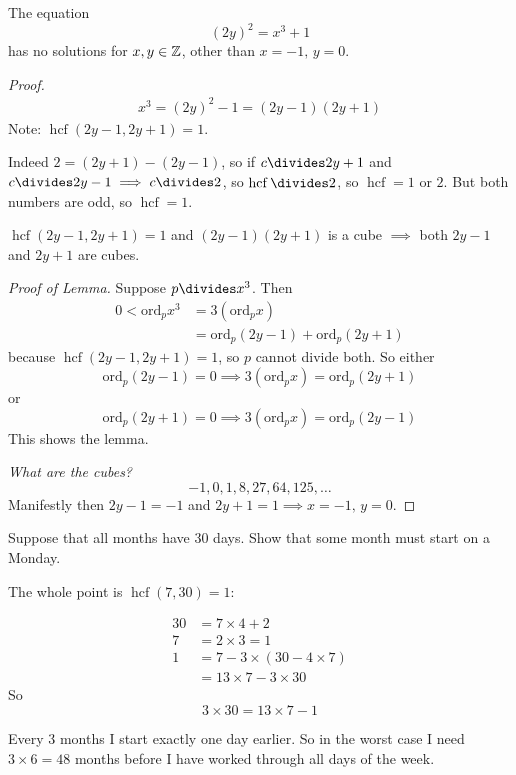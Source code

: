 \documentclass[twoside]{scrartcl}
\DeclareMathOperator{\hcf}{hcf}
\begin{document}
\begin{example}
The equation
\[(2y)^2 = x^3 + 1\]	
has no solutions for $x,y \in\mathbb{Z}$, other than $x =-1,\, y =0$. 

\begin{proof} 
\[
\begin{aligned}
  x^3 = (2y)^2 - 1 = (2y-1)(2y+1)
\end{aligned}
\]
Note: $\hcf(2y-1,2y+1) = 1$. 

Indeed $2 = (2y+1) - (2y-1)$, so if $c \divides 2y + 1$ and $c \divides 2y-1\implies c \divides 2$, so $\hcf\divides 2$, so $\hcf = 1$ or $2$. But both numbers are odd, so $\hcf = 1$.\\

 \begin{lemma} $\hcf(2y-1,2y+1) = 1$ and $(2y-1)(2y+1)$ is a cube $\implies$ both $2y-1$ and $2y+1$ are cubes.
 	
 \end{lemma}

 
 \emph{Proof of Lemma.} Suppose $p \divides x^3$. Then 
 \[
\begin{aligned}
  0 < \mathrm{ord}_px^3 &= 3(\mathrm{ord}_px)\\
  &= \mathrm{ord}_p(2y-1) + \mathrm{ord}_p(2y+1)
\end{aligned}
\]
because $\hcf(2y-1,2y+1) = 1$, so $p$ cannot divide both. So either 
\[\mathrm{ord}_p(2y-1) = 0 \implies 3(\mathrm{ord}_px) = \mathrm{ord}_p(2y+1)\]
or
\[\mathrm{ord}_p(2y+1) = 0 \implies 3(\mathrm{ord}_px) = \mathrm{ord}_p(2y-1)\]
This shows the lemma. 

\emph{What are the cubes?}
\[-1,0,1,8,27,64,125,\dots\]
Manifestly then $2y -1 = -1$ and $2y + 1 = 1\implies x=-1,\, y = 0$.  
\end{proof}
\end{example}\vspace*{10pt}

\begin{example}
Suppose that all months have 30 days. Show that some month must start on a Monday. 

The whole point is $\hcf(7,30)=1$: 

\[
\begin{aligned}
  30 &= 7 \times 4 + 2\\
  7 &= 2 \times 3 = 1\\[0.2cm]
  1 &= 7 -3\times (30 - 4 \times 7)\\
  &= 13 \times 7 - 3 \times 30
\end{aligned}
\]
So 
\[\boxed{3 \times 30 = 13 \times 7 -1}\]

Every 3 months I start exactly one day earlier. So in the worst case I need $3 \times 6 = 48$ months before I have worked through all days of the week. 
\end{example}
\end{document}
